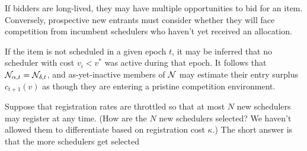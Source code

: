 \begin{example}

  If bidders are long-lived, they may have multiple opportunities to bid for an item.
  Conversely, prospective new entrants must consider whether they will face competition from incumbent schedulers who haven't yet received an allocation.

  If the item is not scheduled in a given epoch $t$, it may be inferred that no scheduler with cost $v_i<v^*$ was active during that epoch.
  It follows that $\mathcal{N}_{\alpha,t} = \mathcal{N}_{\delta,t}$, and as-yet-inactive members of $\mathcal{N}$ may estimate their entry surplus $c_{t+1}(v)$ as though they are entering a pristine competition environment.

  Suppose that registration rates are throttled so that at most $N$ new schedulers may register at any time.
  (How are the $N$ new schedulers selected? We haven't allowed them to differentiate based on registration cost $\kappa$.)
  The short answer is that the more schedulers get selected

\end{example}

\printbibliography